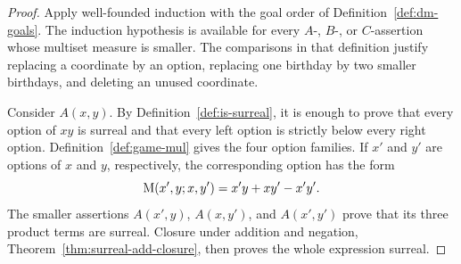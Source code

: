 \begin{proof}
  \leanok
  Apply well-founded induction with the goal order of
  Definition~\ref{def:dm-goals}.  The induction hypothesis is available for
  every \(A\)-, \(B\)-, or \(C\)-assertion whose multiset measure is smaller.
  The comparisons in that definition justify replacing a coordinate by an
  option, replacing one birthday by two smaller birthdays, and deleting an
  unused coordinate.

  Consider \(A(x,y)\).  By Definition~\ref{def:is-surreal}, it is enough to
  prove that every option of \(xy\) is surreal and that every left option is
  strictly below every right option.  Definition~\ref{def:game-mul} gives the
  four option families.  If \(x'\) and \(y'\) are options of \(x\) and \(y\),
  respectively, the corresponding option has the form
  \[
    \operatorname{M}(x',y;x,y')=x'y+xy'-x'y'.
  \]
  The smaller assertions \(A(x',y)\), \(A(x,y')\), and \(A(x',y')\) prove
  that its three product terms are surreal.  Closure under addition and
  negation, Theorem~\ref{thm:surreal-add-closure}, then proves the whole
  expression surreal.


\end{proof}
